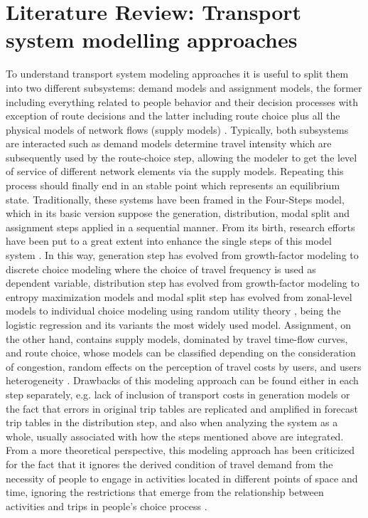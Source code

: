 \documentclass[Journal,letterpaper]{ascelike-new}
\begin{document}
\section{Literature Review: Transport system modelling approaches}
\label{sec:literature_review}
To understand transport system modeling approaches it is useful to split them into two different subsystems: demand models and assignment models, the former including everything related to people behavior and their decision processes with exception of route decisions and the latter including route choice plus all the physical models of network flows (supply models) \citep{flugel2014evaluation}. Typically, both subsystems are interacted such as demand models determine travel intensity which are subsequently used by the route-choice step, allowing the modeler to get the level of service of different network elements via the supply models. Repeating this process should finally end in an stable point which represents an equilibrium state.
Traditionally, these systems have been framed in the Four-Steps model, which in its basic version suppose the generation, distribution, modal split and assignment steps applied in a sequential manner. From its birth, research efforts have been put to a great extent into enhance the single steps of this model system \citep{Boyce2007}. In this way, generation step has evolved from growth-factor modeling to discrete choice modeling where the choice of travel frequency is used as dependent variable, distribution step has evolved from growth-factor modeling to entropy maximization models and modal split step has evolved from zonal-level models to individual choice modeling using random utility theory \citep{OrtuzarWillumsen2011}, being the logistic regression and its variants the most widely used model. Assignment, on the other hand, contains supply models, dominated by travel time-flow curves, and route choice, whose models can be classified depending on the consideration of congestion, random effects on the perception of travel costs by users, and users heterogeneity \citep{WillumsenHensherButton2008}. Drawbacks of this modeling approach can be found either in each step separately, e.g. lack of inclusion of transport costs in generation models or the fact that errors in original trip tables are replicated and amplified in forecast trip tables in the distribution step, and also when analyzing the system as a whole, usually associated with how the steps mentioned above are integrated. From a more theoretical perspective, this modeling approach has been criticized for the fact that it ignores the derived condition of travel demand from the necessity of people to engage in activities located in different points of space and time, ignoring the restrictions that emerge from the relationship between activities and trips in people's choice process \citep{McNallyAndRindt2008}.
\end{document}
